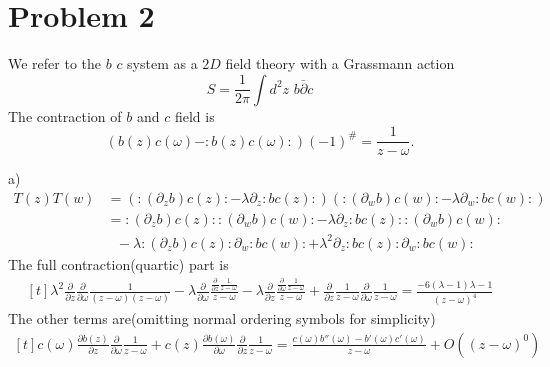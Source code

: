 \documentclass[12pt]{article}
\begin{document}
\section{Problem 2}
We refer to the $b$ $c$ system as a $2D$ field theory with a Grassmann action
\begin{equation}
S=\frac{1}{2\pi } \int d^2 z \,\,b  \bar{\partial} c
\end{equation}
The contraction of $b$ and $c$ field is 
\begin{equation}
(b(z)c(\omega)-:b(z)c(\omega):)(-1)^{\#}=\frac{1}{z-\omega}.
\end{equation}
\begin{paragraph}{a)}
\begin{equation}
\begin{split}
T(z) T(w) & =\left(  : (\partial_z b) c(z): - \lambda \partial_z : b c (z): \right) \left(  : (\partial_w b) c(w): - \lambda \partial_w : b c (w): \right)  \\
& =  : (\partial_z b) c(z):  : (\partial_w b) c(w):  - \lambda \partial_z : b c (z):  : (\partial_w b) c(w):  \\
&~~~- \lambda  : (\partial_z b) c(z):\partial_w : b c (w):  + \lambda^2 \partial_z : b c (z):\partial_w : b c (w): 
\end{split}
\end{equation}
The full contraction(quartic) part is
\begin{equation}
\begin{aligned}[t]
\lambda ^2 \frac{\partial }{\partial z}\frac{\partial }{\partial \omega }\frac{1}{(z-\omega ) (z-\omega )}-\lambda  \frac{\partial }{\partial \omega }\frac{\frac{\partial }{\partial z}\frac{1}{z-\omega }}{z-\omega }-\lambda  \frac{\partial }{\partial z}\frac{\frac{\partial }{\partial \omega }\frac{1}{z-\omega }}{z-\omega }+\frac{\partial }{\partial z}\frac{1}{z-\omega } \frac{\partial }{\partial \omega }\frac{1}{z-\omega }=\frac{-6 (\lambda -1) \lambda -1}{(z-\omega )^4}
\end{aligned}
\end{equation}
The other terms are(omitting normal ordering symbols for simplicity)
\begin{equation}
\begin{aligned}[t]
c(\omega ) \frac{\partial b(z)}{\partial z} \frac{\partial }{\partial \omega }\frac{1}{z-\omega }+c(z) \frac{\partial b(\omega )}{\partial \omega } \frac{\partial }{\partial z}\frac{1}{z-\omega }=\frac{c(\omega ) b''(\omega )-b'(\omega ) c'(\omega )}{z-\omega }+O\left((z-\omega )^0\right)\\

\end{aligned}
\end{equation}
\end{paragraph}
\end{document}
